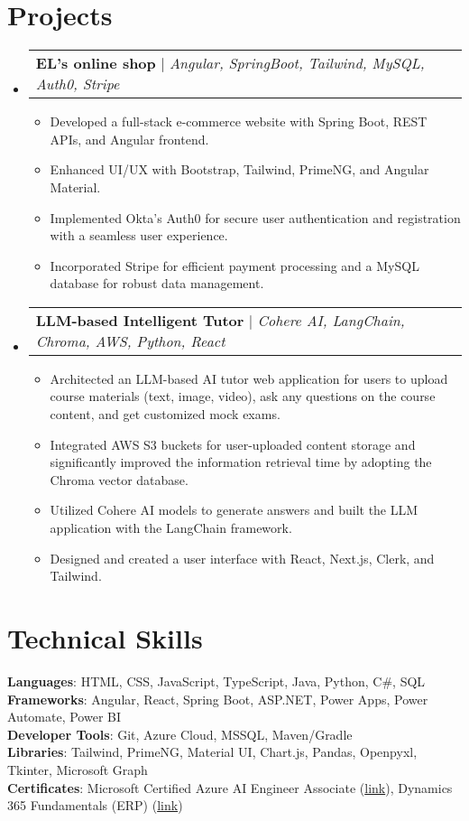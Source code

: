 \documentclass[letterpaper,11pt]{article}
\makeatletter
\newcommand{\resumeItem}[1]{
  \item\small{
    {#1 \vspace{-2pt}}
  }
}
\newcommand{\resumeProjectHeading}[2]{
    \item
    \begin{tabular*}{0.97\textwidth}{l@{\extracolsep{\fill}}r}
      \small#1 & #2 \\
    \end{tabular*}\vspace{-7pt}
}
\newcommand{\resumeSubHeadingListStart}{\begin{itemize}[leftmargin=0.15in, label={}]}
\newcommand{\resumeSubHeadingListEnd}{\end{itemize}}
\newcommand{\resumeItemListStart}{\begin{itemize}}
\newcommand{\resumeItemListEnd}{\end{itemize}\vspace{-5pt}}
\makeatother
\begin{document}
\section{Projects}
   \resumeSubHeadingListStart
     \resumeProjectHeading
         {\textbf{EL's online shop} $|$ \emph{Angular, SpringBoot, Tailwind, MySQL, Auth0, Stripe}}{}
         \resumeItemListStart
           \resumeItem{Developed a full-stack e-commerce website with Spring Boot, REST APIs, and Angular frontend.}
            \resumeItem{Enhanced UI/UX with Bootstrap, Tailwind, PrimeNG, and Angular Material.}
           \resumeItem{Implemented Okta’s Auth0 for secure user authentication and registration with a seamless user experience.}
           \resumeItem{Incorporated Stripe for efficient payment processing and a MySQL database for robust data management.}
         \resumeItemListEnd
    \resumeProjectHeading
         {\textbf{LLM-based Intelligent Tutor} $|$ \emph{Cohere AI, LangChain, Chroma, AWS, Python, React}}{}
         \resumeItemListStart
           \resumeItem{Architected an LLM-based AI tutor web application for users to upload course materials (text, image, video), ask any questions on the course content, and get customized mock exams.}
            \resumeItem{Integrated AWS S3 buckets for user-uploaded content storage and significantly improved the information retrieval time by adopting the Chroma vector database.}
           \resumeItem{Utilized Cohere AI models to generate answers and built the LLM application with the LangChain framework.}
           \resumeItem{Designed and created a user interface with React, Next.js, Clerk, and Tailwind.}
         \resumeItemListEnd
   \resumeSubHeadingListEnd

\section{Technical Skills}
 \begin{itemize}[leftmargin=0.15in, label={}]
    \small{\item{
     \textbf{Languages}{: HTML, CSS, JavaScript, TypeScript, Java, Python, C\#, SQL} \\
     \textbf{Frameworks}{: Angular, React, Spring Boot, ASP.NET, Power Apps, Power Automate, Power BI} \\
     \textbf{Developer Tools}{: Git, Azure Cloud, MSSQL, Maven/Gradle} \\
     \textbf{Libraries}{: Tailwind, PrimeNG, Material UI, Chart.js, Pandas, Openpyxl, Tkinter, Microsoft Graph} \\
    \textbf{Certificates}{: Microsoft Certified Azure AI Engineer Associate (\href{https://learn.microsoft.com/en-us/users/zichengli-4388/credentials/8f80de9e7944a10}{link}), Dynamics 365 Fundamentals (ERP) (\href{https://learn.microsoft.com/en-us/users/zichengli-4388/credentials/5d28421aefedb4ec}{link})}
    }}
 \end{itemize}
\end{document}
